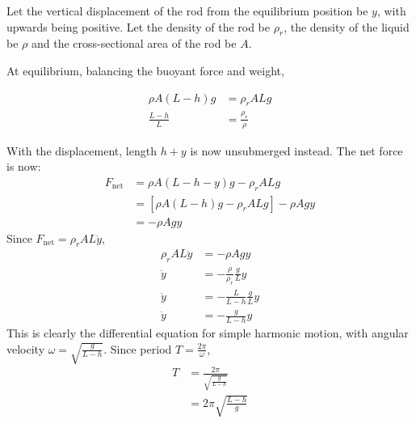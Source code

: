 \begin{solution}
    \begin{subsolution}
        Let the vertical displacement of the rod from the equilibrium position be $y$, with upwards being positive. Let the density of the rod be $\rho_r$, the density of the liquid be $\rho$ and the cross-sectional area of the rod be $A$.

        At equilibrium, balancing the buoyant force and weight,

        \begin{align*}
            \rho A (L-h) g&=\rho_r A L g\\
            \frac{L-h}{L}&=\frac{\rho_r}{\rho}
        \end{align*}

        With the displacement, length $h+y$ is now unsubmerged instead. The net force is now:
        \begin{align*}
            F_{\mathrm{net}}&=\rho A (L-h-y) g-\rho_r A L g\\
            &=[\rho A (L-h) g-\rho_r A L g]-\rho A g y\\
            &=-\rho A g y
        \end{align*}
        Since \(F_{\mathrm{net}}=\rho_r A L \ddot{y}\),
        \begin{align*}
            \rho_r A L \ddot{y}&=-\rho A g y\\
            \ddot{y}&=-\frac{\rho}{\rho_r} \frac{g}{L} y\\
            \ddot{y}&=-\frac{L}{L-h} \frac{g}{L} y\\
            \ddot{y}&=-\frac{g}{L-h} y
        \end{align*}
        This is clearly the differential equation for simple harmonic motion, with angular velocity \(\omega=\sqrt{\frac{g}{L-h}}\). Since period \(T=\frac{2\pi}{\omega}\),
        \begin{align*}
            T&=\frac{2\pi}{\sqrt{\frac{g}{L-h}}}\\
            &=\boxed{2\pi\sqrt{\frac{L-h}{g}}}
        \end{align*}
    \end{subsolution}
\end{solution}

